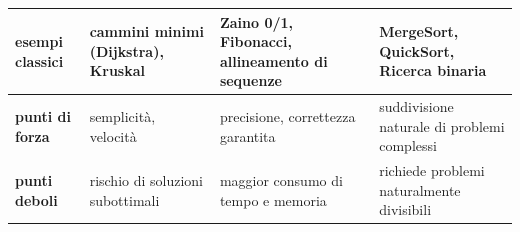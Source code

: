 \begin{table}[ht]
\begin{tabularx}{\textwidth}{|p{3.2cm}|X|X|X|}
        \textbf{esempi classici} & 
        cammini minimi (Dijkstra), Kruskal & 
        Zaino 0/1, Fibonacci, allineamento di sequenze & 
        MergeSort, QuickSort, Ricerca binaria \\ 
        \hline
        
        \textbf{punti di forza} & 
        semplicità, velocità & 
        precisione, correttezza garantita & 
        suddivisione naturale di problemi complessi \\ 
        \hline
        
        \textbf{punti deboli} & 
        rischio di soluzioni subottimali & 
        maggior consumo di tempo e memoria & 
        richiede problemi naturalmente divisibili \\ 
        \hline
        
    \end{tabularx}
\end{table}